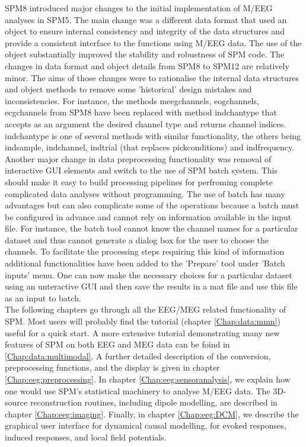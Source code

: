 SPM8 introduced major changes to the initial implementation of M/EEG analyses in SPM5. The main change was a different data format that used an object to ensure internal consistency and integrity of the data structures and provide a consistent interface to the functions using M/EEG data. The use of the object substantially improved  the stability and robustness of SPM code. The changes in data format and object details from SPM8 to SPM12 are relatively minor. The aims of those changes were to rationalise the internal data  structures and object methods to remove some 'historical' design mistakes and inconsistencies. For instance, the methods meegchannels, eogchannels, ecgchannels from SPM8 have been replaced with method indchantype that accepts as an argument the desired channel type and returns channel indices. indchantype is one of several methods with similar functionality, the others being indsample, indchannel, indtrial (that replaces pickconditions) and indfrequency.
\\
Another major change in data preprocessing functionality was removal of interactive GUI elements and switch to the use of SPM batch system. This should make it easy to build processing pipelines for perfroming complete complicated data analyses without programming. The use of batch has many advantages but can also complicate some of the operations because a batch must be configured in advance and cannot rely on information available in the input file. For instance, the batch tool cannot know the channel names for a particular dataset and thus cannot generate a dialog box for the user to choose the channels. To facilitate the processing steps requiring this kind of information additional functionalities have been added to the 'Prepare' tool under 'Batch inputs' menu. One can now make the necessary choices for a particular dataset using an unteractive GUI and then save the results in a mat file and use this file as an input to batch. 
\\
The following chapters go through all the EEG/MEG related functionality of SPM. Most users will probably find the tutorial (chapter \ref{Chap:data:mmn}) useful for a quick start. A more extensive tutorial demonstrating many new features of SPM on both EEG and MEG data can be foind in \ref{Chap:data:multimodal}. A further detailed description of the conversion, preprocessing functions, and the display is given in chapter \ref{Chap:eeg:preprocessing}. In chapter \ref{Chap:eeg:sensoranalysis}, we explain how one would use SPM's statistical machinery to analyse M/EEG data. The 3D-source reconstruction routines, including dipole modelling, are described in chapter \ref{Chap:eeg:imaging}. Finally, in chapter \ref{Chap:eeg:DCM}, we describe the graphical user interface for dynamical causal modelling, for evoked responses, induced responses, and local field potentials.

